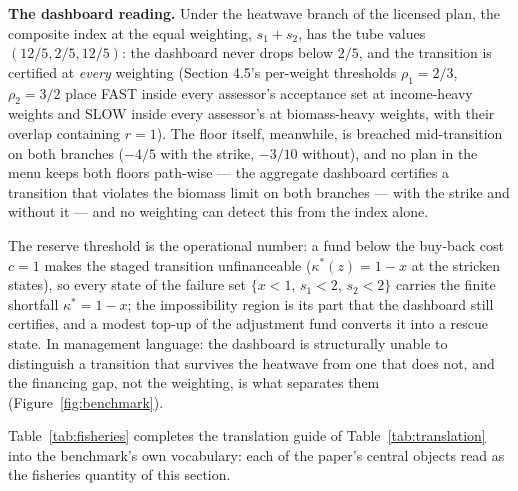 \documentclass[3p,11pt]{elsarticle}
\begin{document}
\textbf{The dashboard reading.} Under the heatwave branch of the
licensed plan, the composite index at the equal weighting, \(s_1 + s_2\),
has the tube values \((12/5, 2/5, 12/5)\): the dashboard never drops below
\(2/5\), and the transition is certified at \emph{every} weighting
(Section 4.5's per-weight thresholds \(\rho_1 = 2/3\), \(\rho_2 = 3/2\) place
FAST inside every assessor's acceptance set at income-heavy weights and SLOW
inside every assessor's at biomass-heavy weights, with their overlap
containing \(r = 1\)). The floor itself, meanwhile, is breached
mid-transition on both branches (\(-4/5\) with the strike, \(-3/10\)
without), and no plan in the menu keeps both floors path-wise --- the
aggregate dashboard certifies a transition that violates the biomass limit
on both branches --- with the strike and without it --- and no weighting
can detect this from the index alone.

The reserve threshold is the operational number: a fund below
the buy-back cost \(c = 1\) makes the staged transition
unfinanceable (\(\kappa^*(z) = 1 - x\) at the stricken states), so every
state of the failure set \(\{x < 1,\, s_1 < 2,\, s_2 < 2\}\) carries
the finite shortfall \(\kappa^* = 1 - x\); the impossibility region is
its part that the dashboard still certifies, and a modest top-up of the
adjustment fund converts it into a rescue state. In
management language: the dashboard is structurally unable to distinguish a
transition that survives the heatwave from one that does not, and the
financing gap, not the weighting, is what separates them
(Figure~\ref{fig:benchmark}).

\medskip

\noindent Table~\ref{tab:fisheries} completes the translation guide of
Table~\ref{tab:translation} into the benchmark's own vocabulary: each of
the paper's central objects read as the fisheries quantity of this
section.
\end{document}

